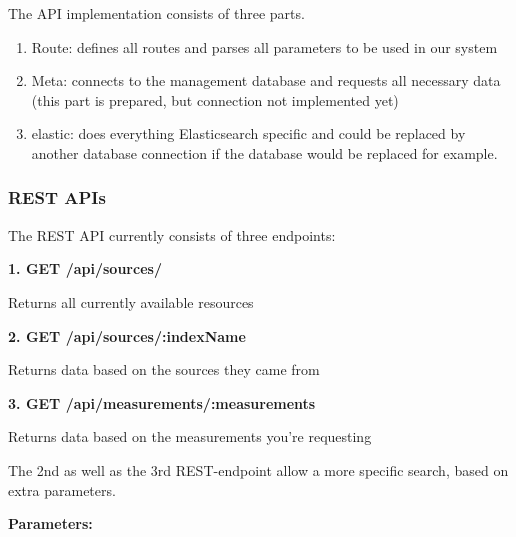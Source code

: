 The API implementation consists of three parts.

\begin{enumerate}
\def\labelenumi{\arabic{enumi}.}
\tightlist
\item
  Route: defines all routes and parses all parameters to be used in our
  system
\item
  Meta: connects to the management database and requests all necessary
  data (this part is prepared, but connection not implemented yet)
\item
  elastic: does everything Elasticsearch specific and could be replaced
  by another database connection if the database would be replaced for
  example.
\end{enumerate}

\subsubsection{REST APIs}\label{rest-apis}

The REST API currently consists of three endpoints:

\textbf{1. GET /api/sources/}

Returns all currently available resources

\textbf{2. GET /api/sources/:indexName}

Returns data based on the sources they came from

\textbf{3. GET /api/measurements/:measurements}

Returns data based on the measurements you're requesting

The 2nd as well as the 3rd REST-endpoint allow a more specific search,
based on extra parameters.

\textbf{Parameters:}

